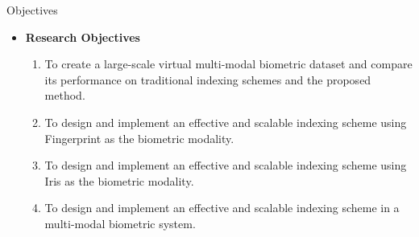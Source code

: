 \begin{frame}[t]{Objectives}
	\topline
    \begin{itemize}
    	\item \textcolor{navy_theme}{\textbf{Research Objectives}}
		\vspace{1em}
		\begin{enumerate}
			\setlength\itemsep{1.5em}
		    \item<1,5>{To create a large-scale virtual multi-modal biometric dataset and compare its performance on traditional indexing schemes and the proposed method.}

			\item<2,5>{ To design and implement an effective and scalable indexing scheme using Fingerprint as the biometric modality.}
			
			\item<3,5>{ To design and implement an effective and scalable indexing scheme using Iris as the biometric modality.}
			
			\item<4,5>{ To design and implement an effective and scalable indexing scheme in a multi-modal biometric system.}
		\end{enumerate}
	\end{itemize}
\end{frame}